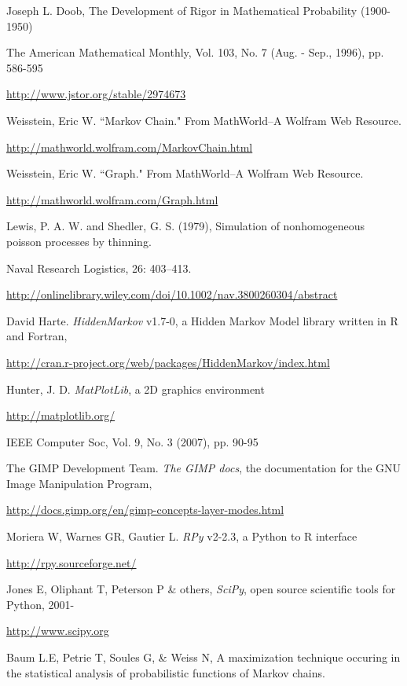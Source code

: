 \documentclass{report}
\begin{document}
\begin{thebibliography}{9}

	Joseph L. Doob, The Development of Rigor in Mathematical Probability (1900-1950)

	The American Mathematical Monthly, Vol. 103, No. 7 (Aug. - Sep., 1996), pp. 586-595

	\url{http://www.jstor.org/stable/2974673}

	Weisstein, Eric W. ``Markov Chain." From MathWorld--A Wolfram Web Resource. 

	\url{http://mathworld.wolfram.com/MarkovChain.html}

	Weisstein, Eric W. ``Graph." From MathWorld--A Wolfram Web Resource. 
	
	\url{http://mathworld.wolfram.com/Graph.html}

	Lewis, P. A. W. and Shedler, G. S. (1979), Simulation of nonhomogeneous poisson processes by thinning.

	Naval Research Logistics, 26: 403–413.

	\url{http://onlinelibrary.wiley.com/doi/10.1002/nav.3800260304/abstract}

	David Harte. \emph{HiddenMarkov} v1.7-0, a Hidden Markov Model library written in R and Fortran, 

	\url{http://cran.r-project.org/web/packages/HiddenMarkov/index.html}

	Hunter, J. D. \emph{MatPlotLib}, a 2D graphics environment 

	\url{http://matplotlib.org/}

	IEEE Computer Soc, Vol. 9, No. 3 (2007), pp. 90-95

 The GIMP Development Team. \emph{The GIMP docs}, the documentation for the GNU Image Manipulation Program, 

\url{http://docs.gimp.org/en/gimp-concepts-layer-modes.html}

 Moriera W, Warnes GR, Gautier L. \emph{RPy} v2-2.3, a Python to R interface

\url{http://rpy.sourceforge.net/}

 Jones E, Oliphant T, Peterson P \& others, \emph{SciPy}, open source scientific tools for Python, 2001-

\url{http://www.scipy.org}

 Baum L.E, Petrie T, Soules G, \& Weiss N, A maximization technique occuring in the statistical analysis of probabilistic functions of Markov chains.


\end{thebibliography}
\end{document}
